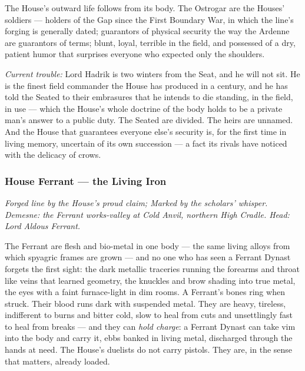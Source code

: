 The House's outward life follows from its body. The Ostrogar are the Houses' soldiers --- holders of the Gap since the First Boundary War, in which the line's forging is generally dated; guarantors of physical security the way the Ardenne are guarantors of terms; blunt, loyal, terrible in the field, and possessed of a dry, patient humor that surprises everyone who expected only the shoulders.

\textit{Current trouble:} Lord Hadrik is two winters from the Seat, and he will not sit. He is the finest field commander the House has produced in a century, and he has told the Seated to their embrasures that he intends to die standing, in the field, in use --- which the House's whole doctrine of the body holds to be a private man's answer to a public duty. The Seated are divided. The heirs are unnamed. And the House that guarantees everyone else's security is, for the first time in living memory, uncertain of its own succession --- a fact its rivals have noticed with the delicacy of crows.

\subsubsection{House Ferrant --- the Living Iron}

\textit{Forged line by the House's proud claim; Marked by the scholars' whisper. Demesne: the Ferrant works-valley at Cold Anvil, northern High Cradle. Head: Lord Aldous Ferrant.}

The Ferrant are flesh and bio-metal in one body --- the same living alloys from which spyagric frames are grown --- and no one who has seen a Ferrant Dynast forgets the first sight: the dark metallic traceries running the forearms and throat like veins that learned geometry, the knuckles and brow shading into true metal, the eyes with a faint furnace-light in dim rooms. A Ferrant's bones ring when struck. Their blood runs dark with suspended metal. They are heavy, tireless, indifferent to burns and bitter cold, slow to heal from cuts and unsettlingly fast to heal from breaks --- and they can \textit{hold charge}: a Ferrant Dynast can take vim into the body and carry it, ebbs banked in living metal, discharged through the hands at need. The House's duelists do not carry pistols. They are, in the sense that matters, already loaded.

